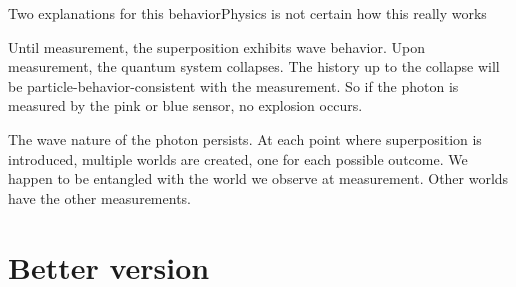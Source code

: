 \begin{frame}{Two explanations for this behavior}{Physics is not certain how this really works}
  \begin{description}
     \item<1->[\href{https://en.wikipedia.org/wiki/Copenhagen_interpretation}{Copenhagen}] Until measurement, the superposition exhibits wave behavior.  Upon measurement, the quantum system collapses.  The history up to the collapse will be particle-behavior-consistent with the measurement.  So if the photon is measured by the \textcolor{\RCone}{pink} or
     \textcolor{\RCtwo}{blue} sensor, no explosion occurs.
     \item<2>[\href{https://en.wikipedia.org/wiki/Many-worlds_interpretation}{Many worlds}] The wave nature of the photon persists.  At each point where superposition is introduced, multiple worlds are created, one for each possible outcome.  We happen to be entangled with the world we observe at measurement.  Other worlds have the other measurements.
  \end{description}
  
\end{frame}

\section*{Better version}

